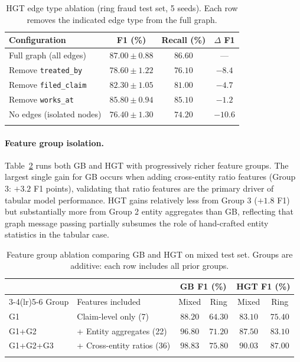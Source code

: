 \documentclass[pdflatex,sn-mathphys-num]{sn-jnl}
\theoremstyle{thmstyleone}
\theoremstyle{thmstyletwo}
\theoremstyle{thmstylethree}
\begin{document}
\begin{table}[h]
\caption{HGT edge type ablation (ring fraud test set, 5 seeds). Each row
  removes the indicated edge type from the full graph.}\label{tab:ablation_edges}
\begin{tabular}{@{}lccc@{}}
\toprule
Configuration & F1 (\%) & Recall (\%) & $\Delta$ F1 \\
\midrule
Full graph (all edges)       & $87.00 \pm 0.88$ & $86.60$ & --- \\
Remove \texttt{treated\_by}  & $78.60 \pm 1.22$ & $76.10$ & $-8.4$ \\
Remove \texttt{filed\_claim} & $82.30 \pm 1.05$ & $81.00$ & $-4.7$ \\
Remove \texttt{works\_at}    & $85.80 \pm 0.94$ & $85.10$ & $-1.2$ \\
No edges (isolated nodes)    & $76.40 \pm 1.30$ & $74.20$ & $-10.6$ \\
\botrule
\end{tabular}
\end{table}

\paragraph{Feature group isolation.}
Table~\ref{tab:ablation_features} runs both GB and HGT with
progressively richer feature groups. The largest single gain for GB
occurs when adding cross-entity ratio features (Group 3: $+3.2$ F1
points), validating that ratio features are the primary driver of
tabular model performance. HGT gains relatively less from Group 3
($+1.8$ F1) but substantially more from Group 2 entity aggregates than
GB, reflecting that graph message passing partially subsumes the role
of hand-crafted entity statistics in the tabular case.

\begin{table}[h]
\caption{Feature group ablation comparing GB and HGT on mixed test set.
  Groups are additive: each row includes all prior groups.}\label{tab:ablation_features}
\begin{tabular}{@{}llcccc@{}}
\toprule
& & \multicolumn{2}{c}{GB F1 (\%)} & \multicolumn{2}{c}{HGT F1 (\%)} \\
\cmidrule(lr){3-4}\cmidrule(lr){5-6}
Group & Features included & Mixed & Ring & Mixed & Ring \\
\midrule
G1     & Claim-level only (7)       & $88.20$ & $64.30$ & $83.10$ & $75.40$ \\
G1+G2  & + Entity aggregates (22)   & $96.80$ & $71.20$ & $87.50$ & $83.10$ \\
G1+G2+G3 & + Cross-entity ratios (36) & $\mathbf{98.83}$ & $75.80$ & $\mathbf{90.03}$ & $\mathbf{87.00}$ \\
\botrule
\end{tabular}
\end{table}
\end{document}
